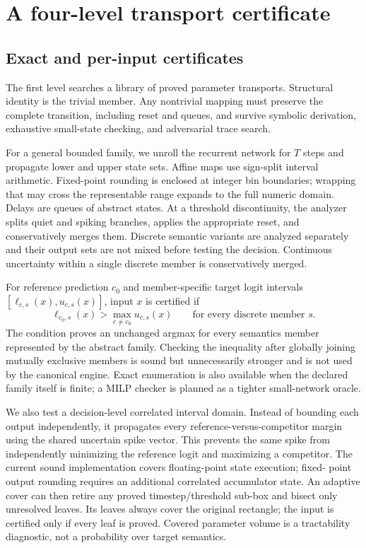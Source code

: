 \section{A four-level transport certificate}

\subsection{Exact and per-input certificates}

The first level searches a library of proved parameter transports. Structural
identity is the trivial member. Any nontrivial mapping must preserve the complete
transition, including reset and queues, and survive symbolic derivation,
exhaustive small-state checking, and adversarial trace search.

For a general bounded family, we unroll the recurrent network for $T$ steps and
propagate lower and upper state sets. Affine maps use sign-split interval
arithmetic. Fixed-point rounding is enclosed at integer bin boundaries; wrapping
that may cross the representable range expands to the full numeric domain.
Delays are queues of abstract states. At a threshold discontinuity, the analyzer
splits quiet and spiking branches, applies the appropriate reset, and conservatively
merges them. Discrete semantic variants are analyzed separately and their output
sets are not mixed before testing the decision. Continuous uncertainty within a
single discrete member is conservatively merged.

For reference prediction $c_0$ and member-specific target logit intervals
$[\ell_{c,s}(x),u_{c,s}(x)]$, input $x$ is certified if
\begin{equation}
  \ell_{c_0,s}(x) > \max_{c\ne c_0} u_{c,s}(x)
  \qquad \text{for every discrete member }s.
\end{equation}
The condition proves an unchanged argmax for every semantics member represented
by the abstract family. Checking the inequality after globally joining mutually
exclusive members is sound but unnecessarily stronger and is not used by the
canonical engine. Exact enumeration is also available when the declared family
itself is finite; a MILP checker is planned as a tighter small-network oracle.

We also test a decision-level correlated interval domain. Instead of bounding
each output independently, it propagates every reference-versus-competitor
margin using the shared uncertain spike vector. This prevents the same spike
from independently minimizing the reference logit and maximizing a competitor.
The current sound implementation covers floating-point state execution; fixed-
point output rounding requires an additional correlated accumulator state.
An adaptive cover can then retire any proved timestep/threshold sub-box and
bisect only unresolved leaves. Its leaves always cover the original rectangle;
the input is certified only if every leaf is proved. Covered parameter volume
is a tractability diagnostic, not a probability over target semantics.


